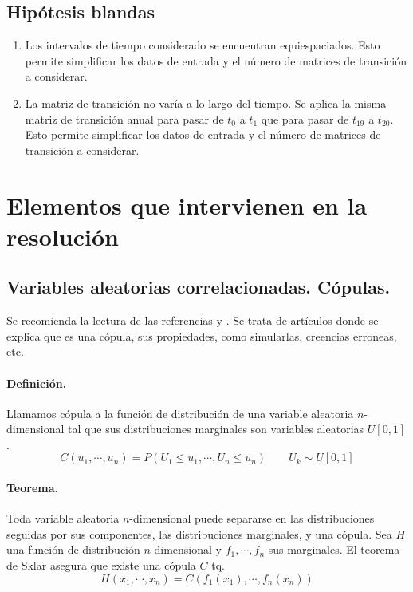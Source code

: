 \subsection{Hip\'otesis blandas}
\begin{enumerate}
\item Los intervalos de tiempo considerado se encuentran equiespaciados. Esto 
permite simplificar los datos de entrada y el n\'umero de matrices de 
transici\'on a considerar.
\item La matriz de transici\'on no var\'ia a lo largo del tiempo. Se aplica 
la misma matriz de transici\'on anual para pasar de $t_0$ a $t_1$ que para 
pasar de $t_{19}$ a $t_{20}$. Esto permite simplificar los datos de entrada y 
el n\'umero de matrices de transici\'on a considerar.
\end{enumerate}


\section{Elementos que intervienen en la resoluci\'on}

\subsection{Variables aleatorias correlacionadas. C\'opulas.}

Se recomienda la lectura de las referencias \cite{copu:wang} y 
\cite{copu:pitfalls}. Se trata de art\'iculos donde se explica que es una 
c\'opula, sus propiedades, como simularlas, creencias erroneas, etc.

\paragraph{Definici\'on.} Llamamos c\'opula a la funci\'on de distribuci\'on
de una variable aleatoria $n$-dimensional tal que sus distribuciones marginales 
son variables aleatorias $U[0,1]$.
\begin{displaymath}
C(u_1, \cdots,u_n)=P(U_1 \leq u_1, \cdots, U_n \leq u_n) \qquad U_k \sim U[0,1]
\end{displaymath}

\paragraph{Teorema.} Toda variable aleatoria $n$-dimensional puede separarse 
en las distribuciones seguidas por sus componentes, las distribuciones marginales,
y una c\'opula. Sea $H$ una funci\'on de distribuci\'on $n$-dimensional y 
$f_1,\cdots, f_n$ sus marginales. El teorema de Sklar asegura que existe una 
c\'opula $C$ tq.
\begin{displaymath}
H(x_1, \cdots,x_n) = C(f_1(x_1), \cdots, f_n(x_n)) 
\end{displaymath}


